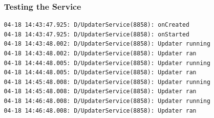 \begin{frame}[fragile]
\frametitle{Testing the Service}
\lstset{language=shell}
\begin{lstlisting}[caption=LogCat output]
04-18 14:43:47.925: D/UpdaterService(8858): onCreated
04-18 14:43:47.925: D/UpdaterService(8858): onStarted
04-18 14:43:48.002: D/UpdaterService(8858): Updater running
04-18 14:43:48.002: D/UpdaterService(8858): Updater ran
04-18 14:44:48.005: D/UpdaterService(8858): Updater running
04-18 14:44:48.005: D/UpdaterService(8858): Updater ran
04-18 14:45:48.008: D/UpdaterService(8858): Updater running
04-18 14:45:48.008: D/UpdaterService(8858): Updater ran
04-18 14:46:48.008: D/UpdaterService(8858): Updater running
04-18 14:46:48.008: D/UpdaterService(8858): Updater ran
\end{lstlisting}
\end{frame}


